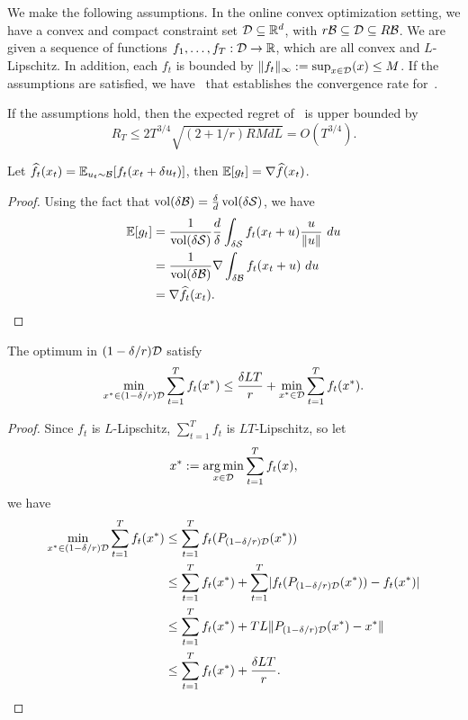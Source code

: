 \documentclass[11pt]{article}
\begin{document}
We make the following assumptions. In the online convex optimization setting, we have a convex and compact constraint set $\mathcal{D} \subseteq \mathbb{R}^d$, with $r\mathcal{B} \subseteq \mathcal{D} \subseteq R\mathcal{B}$. We are given a sequence of functions $f_1, \dots, f_T : \mathcal{D} \to \mathbb{R}$, which are all convex and $L$-Lipschitz. In addition, each $f_t$ is bounded by $\lVert f_t\rVert_\infty := \sup_{x \in \mathcal{D}}(x) \le M$.
If the assumptions are satisfied, we have~ that establishes the convergence rate for~.

\begin{theorem}
    \label{thm:main}
    If the assumptions hold, then the expected regret of~ is upper bounded by
    \[
        R_T \le 2T^{3/4}\sqrt{(2 + 1/r)RMdL} = O(T^{3/4}).
    \]
\end{theorem}

\begin{lemma}
    Let $\widehat{f}_t(x_t) = \operatorname*{\mathbb{E}}_{u_t \sim \mathcal{B}}[f_t(x_t + \delta u_t)]$, then $\operatorname*{\mathbb{E}}[g_t] = \nabla \widehat{f}(x_t)$.
\end{lemma}
\begin{proof}
    Using the fact that $\operatorname{vol}(\delta \mathcal{B}) = \frac{\delta}{d} \operatorname{vol}(\delta \mathcal{S})$, we have
    \begin{align*}
        \operatorname*{\mathbb{E}}[g_t]
        &= \frac{1}{\operatorname{vol}(\delta \mathcal{S})}\frac{d}{\delta} \int_{\delta \mathcal{S}} f_t(x_t + u) \frac{u}{\lVert u\rVert} ~du\\
        &= \frac{1}{\operatorname{vol}(\delta \mathcal{B})} \nabla \int_{\delta \mathcal{B}} f_t(x_t + u)~du\\
        &= \nabla \widehat{f}_t(x_t). \qedhere
    \end{align*}
\end{proof}

\begin{lemma}
    The optimum in $(1 - \delta/r)\mathcal{D}$ satisfy
    \[
        \min_{x^* \in (1 - \delta/r)\mathcal{D}} \sum_{t=1}^T f_t(x^*) \le \frac{\delta LT}{r} + \min_{x^* \in \mathcal{D}} \sum_{t=1}^T f_t(x^*).
    \]
\end{lemma}
\begin{proof}
    Since $f_t$ is $L$-Lipschitz, $\sum_{t=1}^T f_t$ is $LT$-Lipschitz, so let
    \[
        x^* := \operatorname*{\arg\min}_{x \in \mathcal{D}} \sum_{t=1}^T f_t(x),
    \]
    we have
    \begin{align*}
        \min_{x^* \in (1 - \delta/r)\mathcal{D}} \sum_{t=1}^T f_t(x^*)
        &\le \sum_{t=1}^T f_t(P_{(1 - \delta/r)\mathcal{D}}(x^*))\\
        &\le \sum_{t=1}^T f_t(x^*) + \sum_{t=1}^T \lvert f_t(P_{(1 - \delta/r)\mathcal{D}}(x^*)) - f_t(x^*)\rvert\\
        &\le \sum_{t=1}^T f_t(x^*) + TL\lVert P_{(1 - \delta/r)\mathcal{D}}(x^*) - x^*\rVert\\
        &\le \sum_{t=1}^T f_t(x^*) + \frac{\delta LT}{r}. \qedhere
    \end{align*}
\end{proof}
\end{document}
